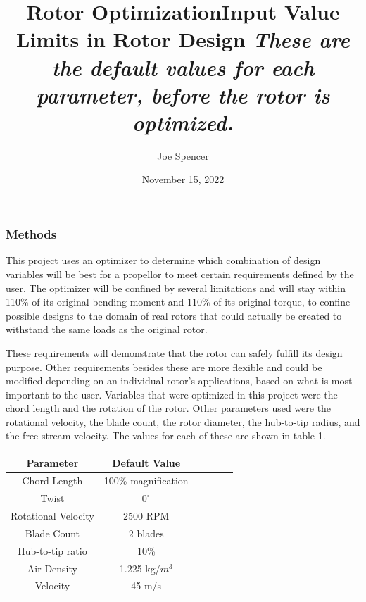 \documentclass{article}
\begin{document}
\author{Joe Spencer}
\title{Rotor Optimization}
\date{November 15, 2022}
\maketitle

\subsubsection*{Methods}

This project uses an optimizer to determine which combination of design variables will be best for a propellor to meet certain requirements defined by the user. The optimizer will be confined by several limitations and will stay within 110\% of its original bending moment and 110\% of its original torque, to confine possible designs to the domain of real rotors that could actually be created to withstand the same loads as the original rotor.

These requirements will demonstrate that the rotor can safely fulfill its design purpose. Other requirements besides these are more flexible and could be modified depending on an individual rotor's applications, based on what is most important to the user. Variables that were optimized in this project were the chord length and the rotation of the rotor. Other parameters used were the rotational velocity, the blade count, the rotor diameter, the hub-to-tip radius, and the free stream velocity. The values for each of these are shown in table 1. \newline

\begin{table}[bp]
	\centering
	\title{Input Value Limits in Rotor Design \newline}
	\title{\emph{These are the default values for each parameter, before the rotor is optimized.}} \label{table:1} \newline
	\begin{tabular}{| c | c | c | c | c | c |}
		 \hline
  		 \textbf{Parameter} & \textbf{Default Value} \\ \hline
		 Chord Length & 100\% magnification \\
		 Twist & $0^{\circ}$ \\
		 Rotational Velocity & 2500 RPM \\
		 Blade Count & 2 blades \\
		 Hub-to-tip ratio & 10\% \\
		 Air Density & 1.225 kg/$m^{3}$ \\
		 Velocity & 45 m/s \\ \hline
	\end{tabular}
\end{table}
\end{document}
